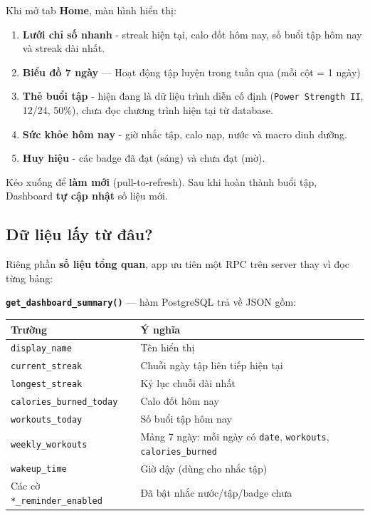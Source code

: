 \documentclass[12pt,a4paper]{article}
\newcounter{none}
\providecommand{\tightlist}{%
  \setlength{\itemsep}{0pt}\setlength{\parskip}{0pt}}
\begin{document}
Khi mở tab \textbf{Home}, màn hình hiển thị:

\begin{enumerate}
\def\labelenumi{\arabic{enumi}.}
\tightlist
\item
  \textbf{Lưới chỉ số nhanh} - streak hiện tại, calo đốt hôm nay, số
  buổi tập hôm nay và streak dài nhất.
\item
  \textbf{Biểu đồ 7 ngày} --- Hoạt động tập luyện trong tuần qua (mỗi
  cột = 1 ngày)
\item
  \textbf{Thẻ buổi tập} - hiện đang là dữ liệu trình diễn cố định
  (\texttt{Power\ Strength\ II}, 12/24, 50\%), chưa đọc chương trình
  hiện tại từ database.
\item
  \textbf{Sức khỏe hôm nay} - giờ nhắc tập, calo nạp, nước và macro dinh
  dưỡng.
\item
  \textbf{Huy hiệu} - các badge đã đạt (sáng) và chưa đạt (mờ).
\end{enumerate}

Kéo xuống để \textbf{làm mới} (pull-to-refresh). Sau khi hoàn thành buổi
tập, Dashboard \textbf{tự cập nhật} số liệu mới.

\subsection{Dữ liệu lấy từ
đâu?}\label{dux1eef-liux1ec7u-lux1ea5y-tux1eeb-ux111uxe2u}

Riêng phần \textbf{số liệu tổng quan}, app ưu tiên một RPC trên server
thay vì đọc từng bảng:

\textbf{\texttt{get\_dashboard\_summary()}} --- hàm PostgreSQL trả về
JSON gồm:

{\def\LTcaptype{none} %
\begin{longtable}[]{@{}
  >{\raggedright\arraybackslash}p{}
  >{\raggedright\arraybackslash}p{}@{}}
\toprule\noalign{}
\begin{minipage}[b]{\linewidth}\raggedright
Trường
\end{minipage} & \begin{minipage}[b]{\linewidth}\raggedright
Ý nghĩa
\end{minipage} \\
\midrule\noalign{}
\endhead
\bottomrule\noalign{}
\endlastfoot
\texttt{display\_name} & Tên hiển thị \\
\texttt{current\_streak} & Chuỗi ngày tập liên tiếp hiện tại \\
\texttt{longest\_streak} & Kỷ lục chuỗi dài nhất \\
\texttt{calories\_burned\_today} & Calo đốt hôm nay \\
\texttt{workouts\_today} & Số buổi tập hôm nay \\
\texttt{weekly\_workouts} & Mảng 7 ngày: mỗi ngày có \texttt{date},
\texttt{workouts}, \texttt{calories\_burned} \\
\texttt{wakeup\_time} & Giờ dậy (dùng cho nhắc tập) \\
Các cờ \texttt{*\_reminder\_enabled} & Đã bật nhắc nước/tập/badge
chưa \\
\end{longtable}
}
\end{document}
